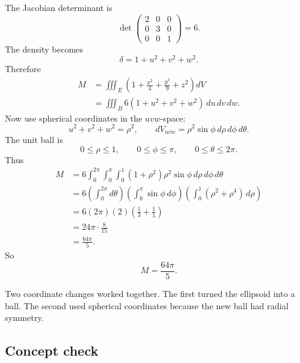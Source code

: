 The Jacobian determinant is
\[
    \det
    \begin{pmatrix}
    2&0&0\\
    0&3&0\\
    0&0&1
    \end{pmatrix}
    =
    6.
\]
The density becomes
\[
    \delta=1+u^2+v^2+w^2.
\]
Therefore
\[
\begin{aligned}
M
&=
\iiint_E
\left(
1+\frac{x^2}{4}+\frac{y^2}{9}+z^2
\right)dV\\
&=
\iiint_B
6(1+u^2+v^2+w^2)\,du\,dv\,dw.
\end{aligned}
\]
Now use spherical coordinates in the \(uvw\)-space:
\[
    u^2+v^2+w^2=\rho^2,
    \qquad
    dV_{uvw}=\rho^2\sin\phi\,d\rho\,d\phi\,d\theta.
\]
The unit ball is
\[
    0\le\rho\le1,
    \qquad
    0\le\phi\le\pi,
    \qquad
    0\le\theta\le2\pi.
\]
Thus
\[
\begin{aligned}
M
&=
6\int_0^{2\pi}\int_0^\pi\int_0^1
(1+\rho^2)\rho^2\sin\phi\,d\rho\,d\phi\,d\theta\\
&=
6
\left(\int_0^{2\pi}d\theta\right)
\left(\int_0^\pi \sin\phi\,d\phi\right)
\left(\int_0^1(\rho^2+\rho^4)\,d\rho\right)\\
&=
6(2\pi)(2)
\left(\frac13+\frac15\right)\\
&=
24\pi\cdot\frac{8}{15}\\
&=
\frac{64\pi}{5}.
\end{aligned}
\]
So
\[
\boxed{
    M=\frac{64\pi}{5}.
}
\]

Two coordinate changes worked together.  The first turned the ellipsoid into a ball.
The second used spherical coordinates because the new ball had radial symmetry.

\subsection{Concept check}


